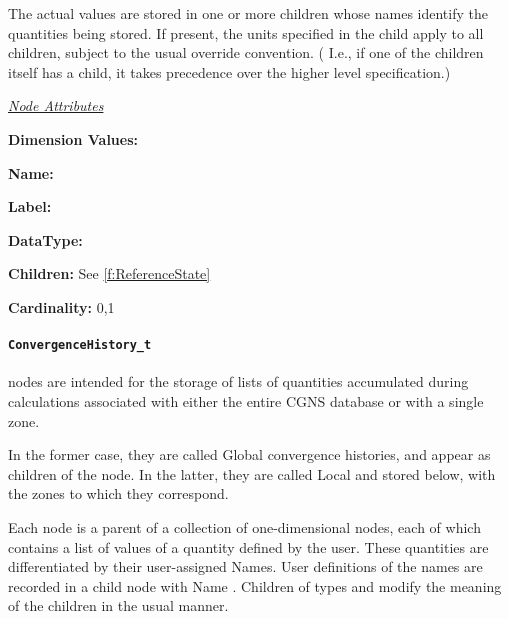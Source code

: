 The actual values are stored in one or more  children
whose names identify the quantities being stored. If present, the
units specified in the  child apply to all
 children, subject to the usual override convention.
( I.e., if one of the  children itself has a
 child, it takes precedence over the higher
level specification.)

\textit{\uline{Node Attributes}}
\begin{Ventryic}{\textbf{Dimension Values:}}
\item [\textbf{Name:}]
\item [\textbf{Label:}]
\item [\textbf{DataType:}]
\item [\textbf{Children:}]
      See \autoref{f:ReferenceState}
\item [\textbf{Cardinality:}]
      0,1
\end{Ventryic}

\paragraph{\texttt{ConvergenceHistory\_t}}

 nodes are intended for the storage of lists
of quantities accumulated during calculations associated with either the
entire CGNS database or with a single zone.

In the former case, they are called Global convergence histories, and
appear as children of the  node. In the latter, they
are called Local and stored below, with the zones to which they correspond.

Each  node is a parent of a collection
of one-dimensional  nodes, each of which contains
a list of values of a quantity defined by the user. These quantities
are differentiated by their user-assigned Names. User definitions of
the names are recorded in a  child node with Name
. Children of types  and
 modify the meaning of the 
children in the usual manner.

